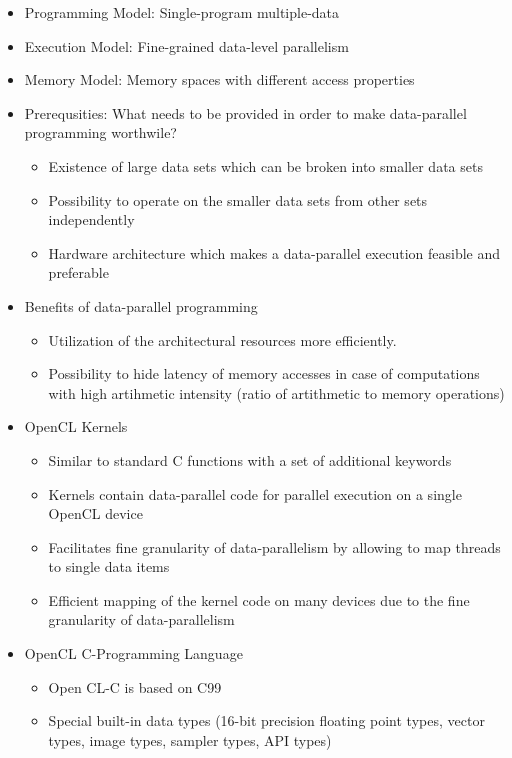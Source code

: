 \documentclass[paper=a4, fontsize=11pt]{scrartcl} %
\numberwithin{equation}{section} %
\numberwithin{figure}{section} %
\numberwithin{table}{section} %
\begin{document}
\begin{itemize}
  \item Programming Model: Single-program multiple-data
  \item Execution Model: Fine-grained data-level parallelism
  \item Memory Model: Memory spaces with different access properties
  \item Prerequsities: What needs to be provided in order to make data-parallel programming worthwile?
  \begin{itemize}
    \item Existence of large data sets which can be broken into smaller data sets
    \item Possibility to operate on the smaller data sets from other sets independently
    \item Hardware architecture which makes a data-parallel execution feasible and preferable
  \end{itemize}
  \item Benefits of data-parallel programming
  \begin{itemize}
    \item Utilization of the architectural resources more efficiently.
    \item Possibility to hide latency of memory accesses in case of computations with high artihmetic intensity (ratio of artithmetic to memory operations)
  \end{itemize}
  \item OpenCL Kernels
  \begin{itemize}
    \item Similar to standard C functions with a set of additional keywords
    \item Kernels contain data-parallel code for parallel execution on a single OpenCL device
    \item Facilitates fine granularity of data-parallelism by allowing to map threads to single data items
    \item Efficient mapping of the kernel code on many devices due to the fine granularity of data-parallelism
  \end{itemize}
  \item OpenCL C-Programming Language
  \begin{itemize}
    \item Open CL-C is based on C99
    \item Special built-in data types (16-bit precision floating point types, vector types, image types, sampler types, API types)

\end{itemize}
\end{itemize}
\end{document}

